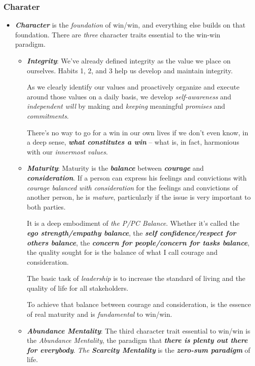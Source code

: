 \documentclass[11pt]{article}
\begin{document}
\subsubsection{Charater}
\begin{itemize}
\item \emph{\textbf{Character}} is the \emph{foundation} of win/win, and everything else builds on that foundation. There are \emph{three} character traits essential to the win-win paradigm.
\begin{itemize}
\item \textbf{\emph{Integrity}}: We've already defined integrity as the value we place on ourselves. Habits 1, 2, and 3 help us develop and maintain integrity. 

As we clearly identify our values and proactively organize and execute around those values on a daily basis, we develop \emph{self-awareness} and \emph{independent will} by making and \emph{keeping} meaningful \emph{promises} and \emph{commitments}.

There's no way to go for a win in our own lives if we don't even know, in a deep sense, \emph{\textbf{what constitutes a win}} -- what is, in fact, harmonious with our \emph{innermost values}. 

\item \textbf{\emph{Maturity}}: Maturity is the \emph{\textbf{balance}} between \emph{\textbf{courage}} and \emph{\textbf{consideration}}. If a person can express his feelings and convictions with \emph{courage balanced with consideration} for the feelings and convictions of another person, he is \emph{mature}, particularly if the issue is very important to both parties.

It is a deep embodiment of \emph{the P/PC Balance}. Whether it's called the \emph{\textbf{ego strength/empathy balance}}, the \emph{\textbf{self confidence/respect for others balance}}, the \emph{\textbf{concern for people/concern for tasks balance}}, the quality sought for is the balance of what I call courage and consideration.

The basic task of \emph{leadership} is to increase the standard of living and the quality of life for all stakeholders.

To achieve that balance between courage and consideration, is the essence of real maturity and is \emph{fundamental} to win/win.

\item \textbf{\emph{Abundance Mentality}}: The third character trait essential to win/win is the \emph{Abundance Mentality}, the paradigm that \emph{\textbf{there is plenty out there for everybody}}. \emph{The \textbf{Scarcity Mentality}} is the \emph{\textbf{zero-sum paradigm}} of life.


\end{itemize}
\end{itemize}
\end{document}
